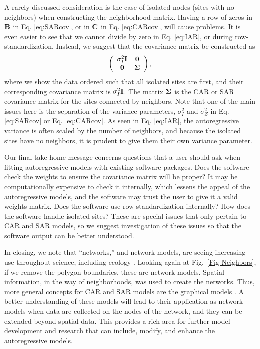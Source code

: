 \documentclass[11pt, titlepage]{article}\usepackage[]{graphicx}\usepackage[]{color}
\begin{document}
\begin{spacing}{1.9}
\begin{flushleft}
A rarely discussed consideration is the case of isolated nodes (sites with no neighbors) when constructing the neighborhood matrix.  Having a row of zeros in $\mathbf{B}$ in Eq. \ref{eq:SARcov}, or in $\mathbf{C}$ in Eq. \ref{eq:CARcov}, will cause problems.  It is even easier to see that we cannot divide by zero in Eq. \ref{eq:IAR}, or during row-standardization.  Instead, we suggest that the covariance matrix be constructed as
\[
	\left(
	\begin{array}{cc}
			\sigma^2_I \mathbf{I} & \mathbf{0} \\
					\mathbf{0} & \mbox{\boldmath $\Sigma$}
	\end{array}
	\right),
\]
where we show the data ordered such that all isolated sites are first, and their corresponding covariance matrix is $\sigma^2_I\mathbf{I}$.  The matrix $\mbox{\boldmath $\Sigma$}$ is the CAR or SAR covariance matrix for the sites connected by neighbors.  Note that one of the main issues here is the separation of the variance parameters, $\sigma^2_I$ and $\sigma^2_Z$ in Eq. \ref{eq:SARcov} or Eq. \ref{eq:CARcov}.  As seen in Eq. \ref{eq:IAR}, the autoregressive variance is often scaled by the number of neighbors, and because the isolated sites have no neighbors, it is prudent to give them their own variance parameter. 

Our final take-home message concerns questions that a user should ask when fitting autoregressive models with existing software packages. Does the software check the weights to ensure the covariance matrix will be proper?  It may be computationally expensive to check it internally, which lessens the appeal of the autoregressive models, and the software may trust the user to give it a valid weights matrix. Does the software use row-standardization internally?  How does the software handle isolated sites?  These are special issues that only pertain to CAR and SAR models, so we suggest investigation of these issues so that the software output can be better understood.

In closing, we note that ``networks,'' and network models, are seeing increasing use throughout science, including ecology \citep{Borr:Mood:Edel:rise:2014}.  Looking again at Fig.~\ref{Fig-Neighbors}, if we remove the polygon boundaries, these are network models.  Spatial information, in the way of neighborhoods, was used to create the networks.  Thus, more general concepts for CAR and SAR models are the graphical models \citep{Laur:grap:1996, Whit:grap:2009}.  A better understanding of these models will lead to their application as network models when data are collected on the nodes of the network, and they can be extended beyond spatial data. This provides a rich area for further model development and research that can include, modify, and enhance the autoregressive models.


\end{flushleft}
\end{spacing}
\end{document}
